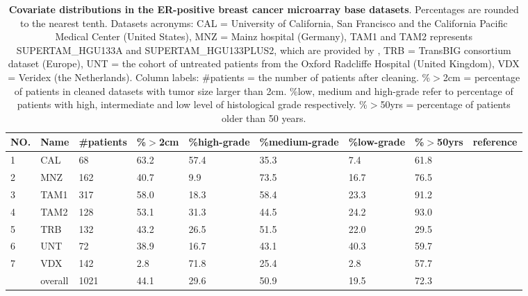\documentclass{bioinfo}
\begin{document}
\begin{table}[!t]
    \begin{tabular*}{1\textwidth}{@{\extracolsep{\fill}}lllllllll}
      NO. & Name & \#patients & \%$>$2cm &  \%high-grade & \%medium-grade & \%low-grade & \%$>$50yrs  &reference\\
      \hline
      1 & CAL & 68 & 63.2  & 57.4 & 35.3 & 7.4 & 61.8 & \citet{chin2006genomic} \\ %
       \hline
      2 & MNZ & 162 & 40.7  & 9.9 & 73.5 & 16.7 & 76.5 & \citet{schmidt2008humoral} \\ %
      \hline
      3 & TAM1 & 317 & 58.0  & 18.3 & 58.4 & 23.3 & 91.2 & \citet{foekens2006multicenter}\\%
       \hline
      4 & TAM2 & 128 & 53.1  & 31.3 & 44.5 & 24.2 & 93.0 & \citet{symmans2010genomic}\\%
       \hline
      5 & TRB  & 132 & 43.2  & 26.5 & 51.5 & 22.0 & 29.5 & \citet{desmedt2007strong} \\%
       \hline
      6 & UNT  & 72 & 38.9  & 16.7& 43.1 & 40.3 & 59.7 & \citet{sotiriou2006gene} \\%
       \hline
      7 & VDX  & 142 & 2.8 & 71.8 & 25.4 & 2.8 & 57.7 & \citet{minn2007lung} \\%
       \hline
      \quad & overall & 1021 & 44.1 & 29.6 & 50.9 & 19.5 & 72.3 &  \quad \\
      \hline
    \end{tabular*}
    \caption{\textbf{Covariate distributions in the ER-positive breast
        cancer microarray base datasets}. 
      Percentages are rounded to the nearest tenth. Datasets
      acronyms: CAL = University of California,
      San Francisco and the California Pacific Medical Center (United
      States), MNZ = Mainz hospital (Germany), TAM1 and TAM2 represents
      SUPERTAM\_HGU133A and SUPERTAM\_HGU133PLUS2, which are provided by \citet{Haibe-Kains2012}, 
      TRB = TransBIG consortium dataset (Europe), UNT = the cohort of
      untreated patients from the Oxford Radcliffe Hospital (United
      Kingdom), VDX = Veridex (the Netherlands). Column labels:
      \#patients = the number of patients after cleaning. \%$>$2cm =
      percentage of patients in cleaned datasets with tumor size
      larger than 2cm. \%low, medium and high-grade refer to percentage
      of patients with high, intermediate and low level of histological grade
      respectively. \%$>$50yrs = percentage of patients older than 50 years.}
    \label{table-datasets}
  \end{table}
\end{document}

